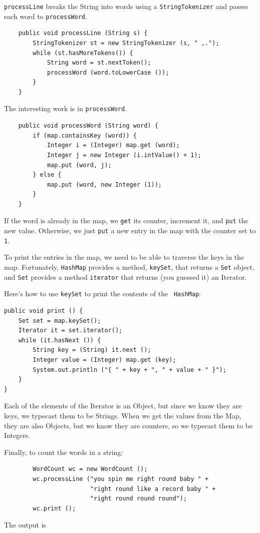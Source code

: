 \documentclass[12pt]{book}
\theoremstyle{exercise}
\begin{document}
{\tt processLine} breaks the String into words using a 
{\tt StringTokenizer} and passes each word to {\tt processWord}.

\begin{verbatim}
    public void processLine (String s) {
        StringTokenizer st = new StringTokenizer (s, " ,.");
        while (st.hasMoreTokens()) {
            String word = st.nextToken();
            processWord (word.toLowerCase ());
        }
    }
\end{verbatim}
%
The interesting work is in {\tt processWord}.

\begin{verbatim}
    public void processWord (String word) {
        if (map.containsKey (word)) {
            Integer i = (Integer) map.get (word);
            Integer j = new Integer (i.intValue() + 1);
            map.put (word, j);
        } else {
            map.put (word, new Integer (1));
        }
    }
\end{verbatim}
%
If the word is already in the map, we {\tt get} its counter,
increment it, and {\tt put} the new value.  Otherwise, we just
{\tt put} a new entry in the map with the counter set to {\tt 1}.



To print the entries in the map, we need to be able to traverse the
keys in the map.  Fortunately, {\tt HashMap}
provides a method, {\tt keySet}, that returns a {\tt Set}
object, and {\tt Set} provides a method {\tt iterator} that returns
(you guessed it) an Iterator.

Here's how to use {\tt keySet} to print the contents of the {\tt
HashMap}:

\begin{verbatim}
public void print () {
    Set set = map.keySet();
    Iterator it = set.iterator();
    while (it.hasNext ()) {
        String key = (String) it.next ();
        Integer value = (Integer) map.get (key);
        System.out.println ("{ " + key + ", " + value + " }"); 
    }
}    
\end{verbatim}
%
Each of the elements of the Iterator is an Object,
but since we know they are keys, we typecast them to be Strings.
When we get the values from the Map, they are also Objects,
but we know they are counters, so we typecast them to be Integers.

Finally, to count the words in a string:

\begin{verbatim}
        WordCount wc = new WordCount ();
        wc.processLine ("you spin me right round baby " +
                        "right round like a record baby " +
                        "right round round round");
        wc.print ();
\end{verbatim}
%
The output is
\end{document}
